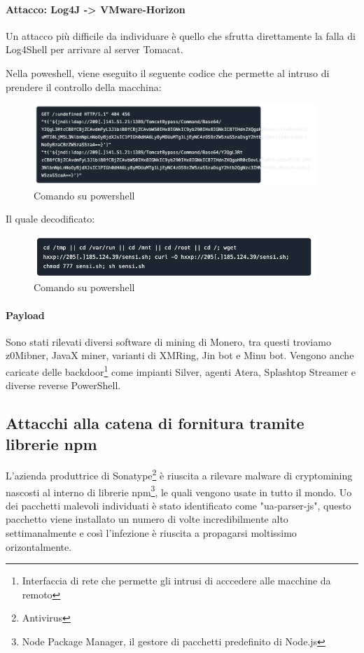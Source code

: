 \documentclass[12pt,a4paper]{article}
\begin{document}
\paragraph{Attacco: Log4J -> VMware-Horizon}
Un attacco più difficile da individuare è quello che sfrutta direttamente la
falla di Log4Shell per arrivare al server Tomacat.

Nella poweshell, viene eseguito il seguente codice che permette al intruso di
prendere il controllo della macchina:

\begin{figure}[ht]
    \centering
    \includegraphics[width=0.95\textwidth]{./images/powershell2.png}
    \caption{Comando su powershell}
    \label{fig:powershell_command2}
\end{figure}

Il quale decodificato:

\begin{figure}[ht]
    \centering
    \includegraphics[width=0.95\textwidth]{./images/powershell3.png}
    \caption{Comando su powershell}
    \label{fig:powershell_command3}
\end{figure}

\paragraph{Payload} Sono stati rilevati diversi software di mining di Monero,
tra questi troviamo z0Mibner, JavaX miner, varianti di XMRing, Jin bot e Minu
bot. Vengono anche caricate delle backdoor\footnote{Interfaccia di rete che
permette gli intrusi di acccedere alle macchine da remoto} come impianti Silver,
agenti Atera, Splashtop Streamer e diverse reverse PowerShell.

\subsection{Attacchi alla catena di fornitura tramite librerie npm}
L'azienda produttrice di Sonatype\footnote{Antivirus} è riuscita a rilevare
malware di cryptomining nascosti al interno di librerie npm\footnote{Node
Package Manager, il gestore di pacchetti predefinito di Node.js}, le quali
vengono usate in tutto il mondo. Uo dei pacchetti malevoli individuati è stato
identificato come "ua-parser-js", questo pacchetto viene installato un numero di
volte incredibilmente alto settimanalmente e così l'infezione è riuscita a
propagarsi moltissimo orizontalmente.
\end{document}
